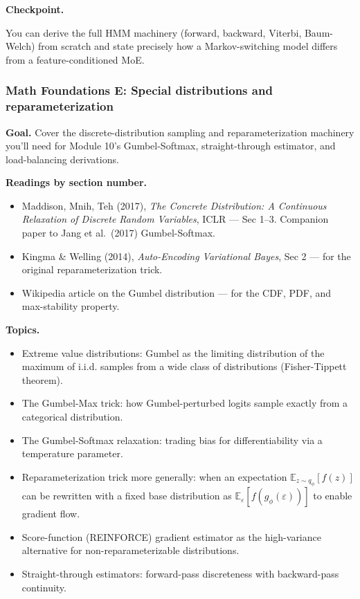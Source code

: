 \textbf{Checkpoint.}

You can derive the full HMM machinery (forward, backward, Viterbi,
Baum-Welch) from scratch and state precisely how a Markov-switching
model differs from a feature-conditioned MoE.

\subsubsection{Math Foundations E: Special distributions and
reparameterization}\label{math-foundations-e-special-distributions-and-reparameterization}

\textbf{Goal.} Cover the discrete-distribution sampling and
reparameterization machinery you'll need for Module 10's Gumbel-Softmax,
straight-through estimator, and load-balancing derivations.

\textbf{Readings by section number.}

\begin{itemize}
\tightlist
\item
  Maddison, Mnih, Teh (2017), \emph{The Concrete Distribution: A
  Continuous Relaxation of Discrete Random Variables}, ICLR --- Sec
  1--3. Companion paper to Jang et al.~(2017) Gumbel-Softmax.
\item
  Kingma \& Welling (2014), \emph{Auto-Encoding Variational Bayes}, Sec
  2 --- for the original reparameterization trick.
\item
  Wikipedia article on the Gumbel distribution --- for the CDF, PDF, and
  max-stability property.
\end{itemize}

\textbf{Topics.}

\begin{itemize}
\tightlist
\item
  Extreme value distributions: Gumbel as the limiting distribution of
  the maximum of i.i.d. samples from a wide class of distributions
  (Fisher-Tippett theorem).
\item
  The Gumbel-Max trick: how Gumbel-perturbed logits sample exactly from
  a categorical distribution.
\item
  The Gumbel-Softmax relaxation: trading bias for differentiability via
  a temperature parameter.
\item
  Reparameterization trick more generally: when an expectation
  \(\mathbb{E}_{z \sim q_\phi}[f(z)]\) can be rewritten with a fixed
  base distribution as
  \(\mathbb{E}_{\varepsilon}[f(g_\phi(\varepsilon))]\) to enable
  gradient flow.
\item
  Score-function (REINFORCE) gradient estimator as the high-variance
  alternative for non-reparameterizable distributions.
\item
  Straight-through estimators: forward-pass discreteness with
  backward-pass continuity.
\end{itemize}

